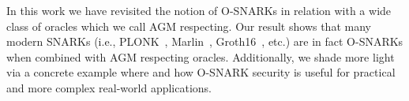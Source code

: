 In this work we have revisited the notion of O-SNARKs in relation with a wide class of oracles which we call AGM 
respecting. Our result shows that many modern SNARKs (i.e., PLONK~\cite{plonk}, Marlin~\cite{marlin}, Groth16~\cite{groth16}, etc.) 
are in fact O-SNARKs when combined with AGM respecting oracles. Additionally, we shade more light via a concrete 
example where and how O-SNARK security is useful for practical and more complex real-world applications. 

